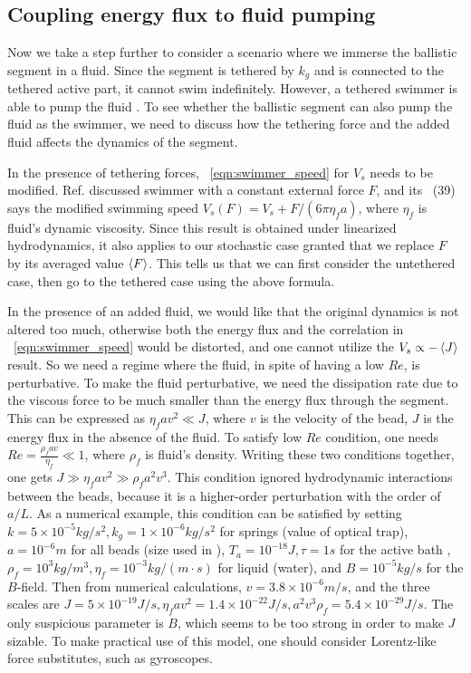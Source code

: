\documentclass[
 preprint,
 preprintnumbers,
 amsmath,amssymb,
 aps,
 pre,
 longbibliography,
 superscriptaddress,
 10pt, twocolumn
]{revtex4-1}
\begin{document}
\subsection{Coupling energy flux to fluid pumping}
Now we take a step further to consider a scenario where we immerse the ballistic segment in a fluid. Since the segment is tethered by $k_g$ and is connected to the tethered active part, it cannot swim indefinitely. However, a tethered swimmer is able to pump the fluid \cite{Leoni2009BasicSwimmer}. To see whether the ballistic segment can also pump the fluid as the swimmer, we need to discuss how the tethering force and the added fluid affects the dynamics of the segment.

In the presence of tethering forces, \eqnname~\eqref{eqn:swimmer_speed} for $V_s$ needs to be modified.
Ref. \cite{Golestanian2008AnalyticResults} discussed swimmer with a constant external force $F$, and its \eqnname~(39) says the modified swimming speed $V_s(F) = V_s + F/(6\pi\eta_f a)$, where $\eta_f$ is fluid's dynamic viscosity.
Since this result is obtained under linearized hydrodynamics, it also applies to our stochastic case granted that we replace $F$ by its averaged value $\expval{F}$.
This tells us that we can first consider the untethered case, then go to the tethered case using the above formula.

In the presence of an added fluid, we would like that the original dynamics is not altered too much, otherwise both the energy flux and the correlation in \eqnname~\eqref{eqn:swimmer_speed} would be distorted, and one cannot utilize the $V_s \propto -\expval{J}$ result.
So we need a regime where the fluid, in spite of having a low $Re$, is perturbative.
To make the fluid perturbative, we need the dissipation rate due to the viscous force to be much smaller than the energy flux through the segment. This can be expressed as $\eta_f a v^2 \ll J$, where $v$ is the velocity of the bead, $J$ is the energy flux in the absence of the fluid.
To satisfy low $Re$ condition, one needs $Re = \frac{\rho_f a v}{\eta_f} \ll 1$, where $\rho_f$ is fluid's density.
Writing these two conditions together, one gets $J \gg \eta_f a v^2 \gg \rho_f a^2 v^3$.
This condition ignored hydrodynamic interactions between the beads, because it is a higher-order perturbation with the order of $a/L$.
As a numerical example, this condition can be satisfied by setting $k=5\times 10^{-5} kg/s^2, k_g=1\times 10^{-6} kg/s^2$ for springs (value of optical trap), $a=10^{-6}m$ for all beads (size used in \cite{Leoni2009BasicSwimmer}), $T_a=10^{-18} J, \tau=1s$ for the active bath \cite{Wu2000ParticleDiffusion}, $\rho_f=10^3kg/m^3, \eta_f=10^{-3}kg/(m\cdot s)$ for liquid (water), and $B=10^{-5} kg/s$ for the $B$-field.
Then from numerical calculations, $v=3.8\times 10^{-6}m/s$, and the three scales are $J=5\times 10^{-19}J/s, \eta_f av^2=1.4\times 10^{-22}J/s, a^2v^3\rho_f=5.4\times 10^{-29}J/s$.
The only suspicious parameter is $B$, which seems to be too strong in order to make $J$ sizable. To make practical use of this model, one should consider Lorentz-like force substitutes, such as gyroscopes.
\end{document}
